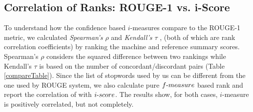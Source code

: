 \documentclass[a4paper]{report}
\begin{document}
\begin{tiny}
\begin{figure}
\begin{floatrow}
\tiny
{}
\end{floatrow}
\end{figure}
\end{tiny}

\subsection{Correlation of Ranks: ROUGE-1 vs. i-Score}

\label{compareResults}
To understand how the confidence based $i$-measures compare to the ROUGE-1 metric, we calculated \textit{Spearman's $\rho$} \cite{Spearman1904} and \textit{Kendall's $\tau$} \cite{Kendall1938}, (both of which are rank correlation coefficients) by ranking the machine and reference summary scores.  Spearman's $\rho$ considers the squared difference between two rankings while Kendall's $\tau$ is based on the number of concordant/discordant pairs (Table \ref{compareTable}). Since the list of stopwords used by us can be different from the one used by ROUGE system, we also calculate pure $f\hbox{-}measure$ based rank and report the correlation of with $i\hbox{-}score$. The results show, for both cases, $i$-measure is positively correlated, but not completely. 
\end{document}
